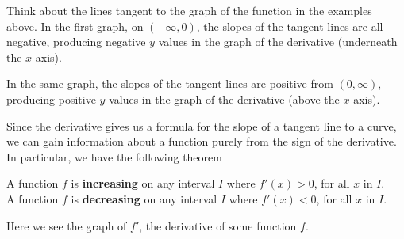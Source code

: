 \documentclass{ximera}
\begin{document}
Think about the lines tangent to the graph of the function in the examples above.
In the first graph, on $(-\infty,0)$, the slopes of the tangent lines are all negative, producing negative $y$ values in the graph of the derivative (underneath the $x$ axis).

In the same graph, the slopes of the tangent lines are positive from $(0,\infty)$, producing positive $y$ values in the graph of the derivative (above the $x$-axis).

Since the derivative gives us a formula for the slope of a tangent
line to a curve, we can gain information about a function purely from
the sign of the derivative.  In particular, we have the following theorem

\begin{theorem}
A function $f$ is \textbf{increasing} on any interval $I$ where $f'(x)>0$, for all $x$ in $I$.\\
A function $f$  is \textbf{decreasing} on any interval $I$ where $f'(x)<0$, for all $x$ in $I$.\\
 \end{theorem}

\begin{question}
  Here we see the graph of $f'$, the derivative of some function $f$.
  \begin{image}
  \end{image}
\end{question}
\end{document}
